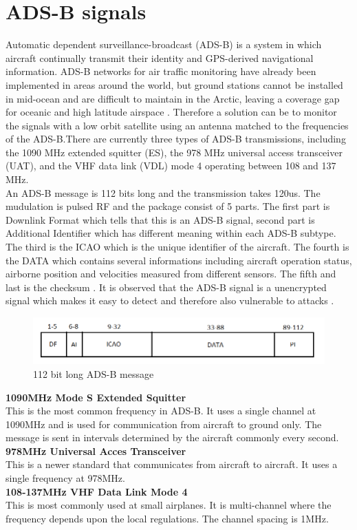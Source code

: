 \chapter{ADS-B signals}\label{ch:adsbsig}

Automatic dependent surveillance-broadcast (ADS-B) is a system in which aircraft continually transmit their identity and GPS-derived navigational information. ADS-B networks for air traffic monitoring have already been implemented in areas around the world, but ground stations cannot be installed in mid-ocean and are difficult to maintain in the Arctic, leaving a coverage gap for oceanic and high latitude airspace \citep{FlyingLab}. Therefore a solution can be to monitor the signals with a low orbit satellite using an antenna matched to the frequencies of the ADS-B.There are currently three types of ADS-B transmissions, including the 1090 MHz extended squitter (ES), the 978 MHz universal access transceiver (UAT), and the VHF data link (VDL) mode 4 operating between 108 and 137 MHz.
 \\
An ADS-B message is 112 bits long and the transmission takes 120us. The mudulation is pulsed RF and the package consist of 5 parts. The first part is Downlink Format which tells that this is an ADS-B signal, second part is Additional Identifier which has different meaning within each ADS-B subtype. The third is the ICAO which is the unique identifier of the aircraft. The fourth is the DATA which contains several informations including aircraft operation status, airborne position and velocities measured from different sensors. The fifth and last is the checksum \citep{Modesorg}. It is observed that the ADS-B signal is a unencrypted signal which makes it easy to detect and therefore also vulnerable to attacks \citep{Attacks}.       

\begin{figure}[h]
\centering 
\includegraphics[scale = 0.5]{figures/adsb_signals/adsb_message.png}
\caption{112 bit long ADS-B message}
\label{fig:adsb_mes}
\end{figure}


\textbf{1090MHz Mode S Extended Squitter}\\
This is the most common frequency in ADS-B. It uses a single channel at 1090MHz and is used for communication from aircraft to ground only. The message is sent in intervals determined by the aircraft commonly every second.   
\\
\textbf{978MHz Universal Acces Transceiver}\\
This is a newer standard that communicates from aircraft to aircraft. It uses a single frequency at 978MHz.  
\\
\textbf{108-137MHz VHF Data Link Mode 4}\\
This is most commonly used at small airplanes. It is multi-channel where the frequency depends upon the local regulations. The channel spacing is 1MHz. 